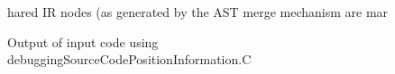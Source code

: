 \begin{figure}[!h]
{\indent
{\mySmallFontSize

\begin{latexonly}
   
\end{latexonly}
hared IR nodes (as generated by the AST
merge mechanism are mar
\begin{htmlonly}
   
\end{htmlonly}

}
}
\caption{Output of input code using debuggingSourceCodePositionInformation.C}
\label{Tutorial:exampleOutput_DebuggingIRNodeToString}
\end{figure}












